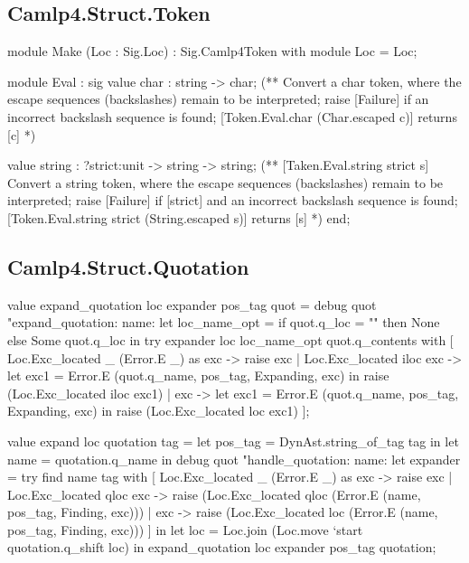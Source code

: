 \subsection{Camlp4.Struct.Token}
\label{Camlp4.Struct.Token}

\begin{ocamlcode}
module Make (Loc : Sig.Loc) : Sig.Camlp4Token with module Loc = Loc;

module Eval : sig
  value char : string -> char;
      (** Convert a char token, where the escape sequences (backslashes)
          remain to be interpreted; raise [Failure] if an
          incorrect backslash sequence is found; [Token.Eval.char (Char.escaped c)]
          returns [c] *)

  value string : ?strict:unit -> string -> string;
      (** [Taken.Eval.string strict s]
          Convert a string token, where the escape sequences (backslashes)
          remain to be interpreted; raise [Failure] if [strict] and an
          incorrect backslash sequence is found;
          [Token.Eval.string strict (String.escaped s)] returns [s] *)
end;
\end{ocamlcode}

\subsection{Camlp4.Struct.Quotation}
\label{Camlp4.Struct.Quotation}

\begin{ocamlcode}
  value expand_quotation loc expander pos_tag quot =
    debug quot "expand_quotation: name: %
    let loc_name_opt = if quot.q_loc = "" then None else Some quot.q_loc in
    try expander loc loc_name_opt quot.q_contents with
    [ Loc.Exc_located _ (Error.E _) as exc ->
        raise exc
    | Loc.Exc_located iloc exc ->
        let exc1 = Error.E (quot.q_name, pos_tag, Expanding, exc) in
        raise (Loc.Exc_located iloc exc1)
    | exc ->
        let exc1 = Error.E (quot.q_name, pos_tag, Expanding, exc) in
        raise (Loc.Exc_located loc exc1) ];

  value expand loc quotation tag =
    let pos_tag = DynAst.string_of_tag tag in
    let name = quotation.q_name in
    debug quot "handle_quotation: name: %
    let expander =
      try find name tag
      with
      [ Loc.Exc_located _ (Error.E _) as exc -> raise exc
      | Loc.Exc_located qloc exc ->
          raise (Loc.Exc_located qloc (Error.E (name, pos_tag, Finding, exc)))
      | exc ->
          raise (Loc.Exc_located loc (Error.E (name, pos_tag, Finding, exc))) ]
    in
    let loc = Loc.join (Loc.move `start quotation.q_shift loc) in
    expand_quotation loc expander pos_tag quotation;
  \end{ocamlcode}

